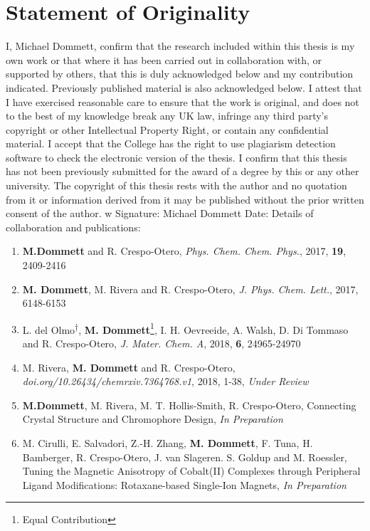 \chapter*{Statement of Originality}
I, Michael Dommett, confirm that the research included within this thesis is my own work or that where it has been carried out in collaboration with, or supported by others, that this is duly acknowledged below and my contribution indicated. Previously published material is also acknowledged below.
I attest that I have exercised reasonable care to ensure that the work is original, and does not to the best of my knowledge break any UK law, infringe any third party's copyright or other Intellectual Property Right, or contain any confidential material.
I accept that the College has the right to use plagiarism detection software to check the electronic version of the thesis.
I confirm that this thesis has not been previously submitted for the award of a degree by this or any other university.
The copyright of this thesis rests with the author and no quotation from it or information derived from it may be published without the prior written consent of the author.
\newline
\newline
w
Signature: Michael Dommett 
Date:
\newline
\newline
Details of collaboration and publications:
\begin{enumerate}
    \item \textbf{M.Dommett} and R. Crespo-Otero, \textit{Phys. Chem. Chem. Phys.}, 2017, \textbf{19}, 2409-2416
    \item \textbf{M. Dommett}, M. Rivera and R. Crespo-Otero, \textit{J. Phys. Chem. Lett.}, 2017, 6148-6153
    \item L. del Olmo\textsuperscript{$\dag$}, \textbf{M. Dommett}\footnote[2]{Equal Contribution}, I. H. Oevreeide, A. Walsh, D. Di Tommaso and R. Crespo-Otero, \textit{J. Mater. Chem. A}, 2018, \textbf{6}, 24965-24970
     \item M. Rivera, \textbf{M. Dommett}  and R. Crespo-Otero, \textit{doi.org/10.26434/chemrxiv.7364768.v1}, 2018, 1-38, \textit{Under Review}
     
    \item \textbf{M.Dommett}, M. Rivera, M. T. Hollis-Smith, R. Crespo-Otero, Connecting Crystal Structure and Chromophore Design, \textit{In Preparation}
    
    \item M. Cirulli, E. Salvadori, Z.-H. Zhang, \textbf{M. Dommett}, F. Tuna, H. Bamberger, R. Crespo-Otero, J. van Slageren. S. Goldup and M. Roessler, Tuning the Magnetic Anisotropy of Cobalt(II) Complexes through Peripheral Ligand Modifications: Rotaxane-based Single-Ion Magnets, \textit{In Preparation}

\end{enumerate}